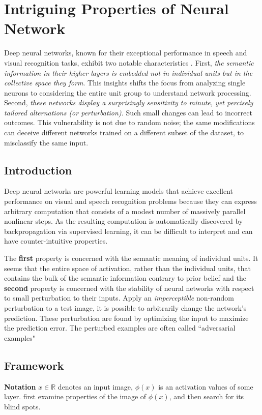 \chapter{Intriguing Properties of Neural Network}

Deep neural networks, known for their exceptional performance in speech and visual recognition tasks, exhibit two notable characteristics \citep{szegedy2013intriguing}. First, \textit{the semantic information in their higher layers is embedded not in individual units but in the collective space they form}. This insights shifts the focus from analyzing single neurons to considering the entire unit group to understand network processing. Second, \textit{these networks display a surprisingly sensitivity to minute, yet percisely tailored alternations (or perturbation).} Such small changes can lead to incorrect outcomes. This vulnerability is not due to random noise; the same modifications can deceive different networks trained on a different subset of the dataset, to misclassify the same input.

\section{Introduction}

Deep neural networks are powerful learning models that achieve excellent performance on visual and speech recognition problems because they can express arbitrary computation that consists of a modest number of massively parallel nonlinear steps. As the resulting computation is automatically discovered by backpropagation via supervised learning, it can be difficult to interpret and can have counter-intuitive properties.

The \textbf{first} property is concerned with the semantic meaning of individual units. It seems that the entire space of activation, rather than the individual units, that contains the bulk of the semantic information contrary to prior belief and the \textbf{second} property is concerned with the stability of neural networks with respect to small perturbation to their inputs. Apply an \textit{imperceptible} non-random perturbation to a test image, it is possible to arbitrarily change the network's prediction. These perturbation are found by optimizing the input to maximize the prediction error. The perturbed examples are often called ``adversarial examples"

\section{Framework}
\textbf{Notation} $x\in \mathbb{R}$ denotes an input image, $\phi(x)$ is an activation values of some layer. \citep{szegedy2013intriguing} first examine properties of the image of $\phi(x)$, and then search for its blind spots. 

